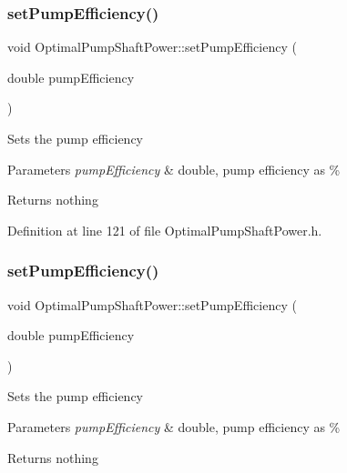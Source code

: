 \subsubsection{\texorpdfstring{set\+Pump\+Efficiency()}{setPumpEfficiency()}\hspace{0.1cm}{\footnotesize\ttfamily [2/3]}}
{\footnotesize\ttfamily void Optimal\+Pump\+Shaft\+Power\+::set\+Pump\+Efficiency (\begin{DoxyParamCaption}\item[{double}]{pump\+Efficiency }\end{DoxyParamCaption})\hspace{0.3cm}{\ttfamily [inline]}}

Sets the pump efficiency


\begin{DoxyParams}{Parameters}
{\em pump\+Efficiency} & double, pump efficiency as \%\\
\hline
\end{DoxyParams}
\begin{DoxyReturn}{Returns}
nothing 
\end{DoxyReturn}


Definition at line 121 of file Optimal\+Pump\+Shaft\+Power.\+h.

\mbox{\label{class_optimal_pump_shaft_power_a2cb2c6b537c7db0bc5071f09c66308d0}} 
\subsubsection{\texorpdfstring{set\+Pump\+Efficiency()}{setPumpEfficiency()}\hspace{0.1cm}{\footnotesize\ttfamily [3/3]}}
{\footnotesize\ttfamily void Optimal\+Pump\+Shaft\+Power\+::set\+Pump\+Efficiency (\begin{DoxyParamCaption}\item[{double}]{pump\+Efficiency }\end{DoxyParamCaption})\hspace{0.3cm}{\ttfamily [inline]}}

Sets the pump efficiency


\begin{DoxyParams}{Parameters}
{\em pump\+Efficiency} & double, pump efficiency as \%\\
\hline
\end{DoxyParams}
\begin{DoxyReturn}{Returns}
nothing 
\end{DoxyReturn}


